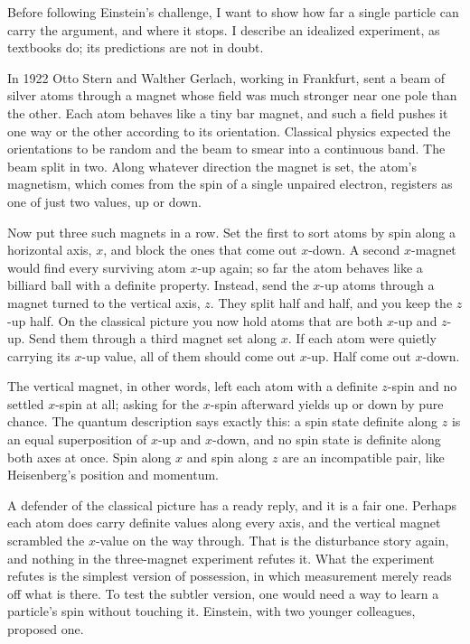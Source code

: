 Before following Einstein's challenge, I want to show how far a single particle can carry the argument, and where it stops. I describe an idealized experiment, as textbooks do; its predictions are not in doubt.

In 1922 Otto Stern and Walther Gerlach, working in Frankfurt, sent a beam of silver atoms through a magnet whose field was much stronger near one pole than the other. Each atom behaves like a tiny bar magnet, and such a field pushes it one way or the other according to its orientation. Classical physics expected the orientations to be random and the beam to smear into a continuous band. The beam split in two. Along whatever direction the magnet is set, the atom's magnetism, which comes from the spin of a single unpaired electron, registers as one of just two values, up or down.

Now put three such magnets in a row. Set the first to sort atoms by spin along a horizontal axis, $x$, and block the ones that come out $x$-down. A second $x$-magnet would find every surviving atom $x$-up again; so far the atom behaves like a billiard ball with a definite property. Instead, send the $x$-up atoms through a magnet turned to the vertical axis, $z$. They split half and half, and you keep the $z$-up half. On the classical picture you now hold atoms that are both $x$-up and $z$-up. Send them through a third magnet set along $x$. If each atom were quietly carrying its $x$-up value, all of them should come out $x$-up. Half come out $x$-down.

The vertical magnet, in other words, left each atom with a definite $z$-spin and no settled $x$-spin at all; asking for the $x$-spin afterward yields up or down by pure chance. The quantum description says exactly this: a spin state definite along $z$ is an equal superposition of $x$-up and $x$-down, and no spin state is definite along both axes at once. Spin along $x$ and spin along $z$ are an incompatible pair, like Heisenberg's position and momentum.

A defender of the classical picture has a ready reply, and it is a fair one. Perhaps each atom does carry definite values along every axis, and the vertical magnet scrambled the $x$-value on the way through. That is the disturbance story again, and nothing in the three-magnet experiment refutes it. What the experiment refutes is the simplest version of possession, in which measurement merely reads off what is there. To test the subtler version, one would need a way to learn a particle's spin without touching it. Einstein, with two younger colleagues, proposed one.

